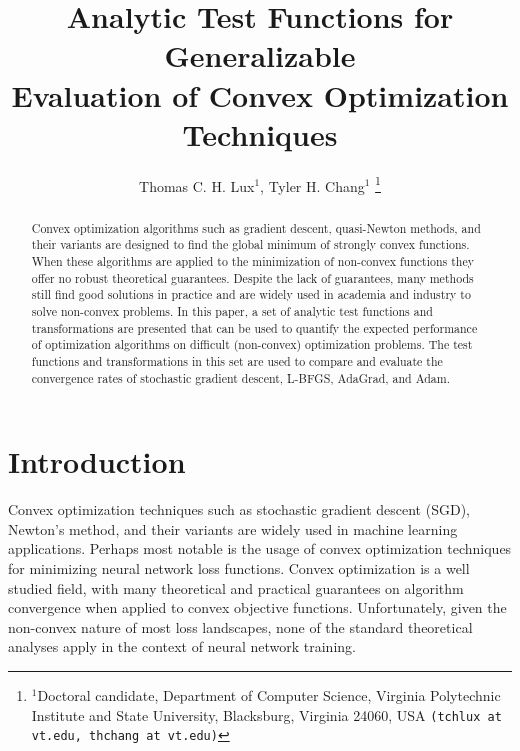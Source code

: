 \documentclass[letterpaper, 10 pt, conference]{IEEEtran}  %
\title{\LARGE \bf Analytic Test Functions for Generalizable
  \\ Evaluation of Convex Optimization Techniques}
\author{Thomas C. H. Lux$^{1}$, Tyler H. Chang$^{1}$%
\thanks{$^{1}$Doctoral candidate, Department of Computer Science, Virginia Polytechnic Institute and State University, Blacksburg, Virginia 24060, USA {\tt\small (tchlux at vt.edu, thchang at vt.edu)}}%
}
\begin{document}
\IEEEoverridecommandlockouts                              %

\maketitle

\begin{abstract}

Convex optimization algorithms such as gradient descent, quasi-Newton
methods, and their variants are designed to find the global minimum of
strongly convex functions. When these algorithms are applied to the
minimization of non-convex functions they offer no robust theoretical
guarantees. Despite the lack of guarantees, many methods still find
good solutions in practice and are widely used in academia and
industry to solve non-convex problems. In this paper, a set of
analytic test functions and transformations are presented that can be
used to quantify the expected performance of optimization algorithms
on difficult (non-convex) optimization problems. The test functions
and transformations in this set are used to compare and evaluate the
convergence rates of stochastic gradient descent, L-BFGS, AdaGrad, and
Adam.

\end{abstract}

\section{Introduction}
\label{sec:introduction}

Convex optimization techniques such as stochastic gradient descent
(SGD), Newton's method, and their variants are widely used in machine
learning applications.  Perhaps most notable is the usage of convex
optimization techniques for minimizing neural network loss functions.
Convex optimization is a well studied field, with many theoretical and
practical guarantees on algorithm convergence when applied to convex
objective functions.  Unfortunately, given the non-convex nature of
most loss landscapes, none of the standard theoretical analyses apply
in the context of neural network training.
\end{document}
